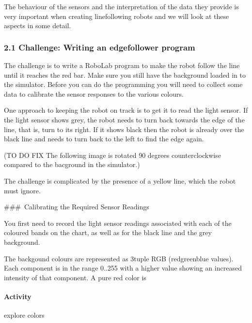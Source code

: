\documentclass[letterpaper,10pt,english]{sphinxmanual}
\begin{document}
{The behaviour of the sensors and the interpretation of the data they provide is very important when creating line\sphinxhyphen{}following robots and we will look at these aspects in some detail.


\subsubsection{2.1 Challenge: Writing an edge\sphinxhyphen{}follower program}
\label{\detokenize{content/04_Robot_Lab/Section_00_02:2.1-Challenge:-Writing-an-edge-follower-program}}
The challenge is to write a RoboLab program to make the robot follow the line until it reaches the red bar. Make sure you still have the  background loaded in to the simulator. Before you can do the programming you will need to collect some data to calibrate the sensor responses to the various colours.

One approach to keeping the robot on track is to get it to read the light sensor. If the light sensor shows grey, the robot needs to turn back towards the edge of the line, that is, turn to its right. If it shows black then the robot is already over the black line and needs to turn back to the left to find the edge again.

(TO DO \sphinxhyphen{} FIX \sphinxhyphen{} The following image is rotated 90 degrees counter\sphinxhyphen{}clockwise compared to the bacground in the simulator.)


The challenge is complicated by the presence of a yellow line, which the robot must ignore.

\#\#\# Calibrating the Required Sensor Readings

You first need to record the light sensor readings associated with each of the coloured bands on the chart, as well as for the black line and the grey background.

The backgound colours are represented as 3\sphinxhyphen{}tuple RGB (red\sphinxhyphen{}green\sphinxhyphen{}blue values). Each component is in the range 0..255 with a higher value showing an increased intensity of that component. A pure red color is


\paragraph{Activity}
\label{\detokenize{content/04_Robot_Lab/Section_00_02:Activity}}
explore colors

}
\end{document}
